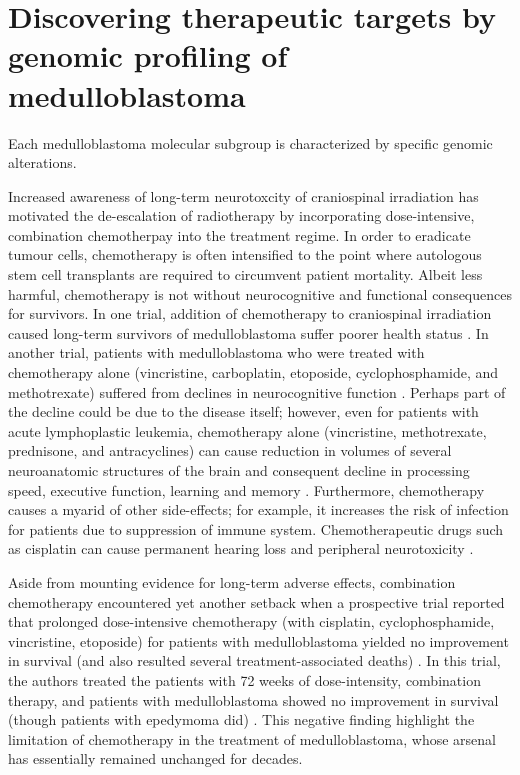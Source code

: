 \chapter{Discovering therapeutic targets by genomic profiling of medulloblastoma}
\label{ch:target-id}

\begin{hypothesis}
Each medulloblastoma molecular subgroup is characterized by specific genomic alterations.
\end{hypothesis}

Increased awareness of long-term neurotoxcity of craniospinal irradiation has motivated the de-escalation of radiotherapy by incorporating dose-intensive, combination chemotherpay into the treatment regime. In order to eradicate tumour cells, chemotherapy is often intensified to the point where autologous stem cell transplants are required to circumvent patient mortality. Albeit less harmful, chemotherapy is not without neurocognitive and functional consequences for survivors. In one trial, addition of chemotherapy to craniospinal irradiation caused long-term survivors of medulloblastoma suffer poorer health status . In another trial, patients with medulloblastoma who were treated with chemotherapy alone (vincristine, carboplatin, etoposide, cyclophosphamide, and methotrexate) suffered from declines in neurocognitive function . Perhaps part of the decline could be due to the disease itself; however, even for patients with acute lymphoplastic leukemia, chemotherapy alone (vincristine, methotrexate, prednisone, and antracyclines) can cause reduction in volumes of several neuroanatomic structures of the brain and consequent decline in processing speed, executive function, learning and memory . Furthermore, chemotherapy causes a myarid of other side-effects; for example, it increases the risk of infection for patients due to suppression of immune system. Chemotherapeutic drugs such as cisplatin can cause permanent hearing loss and peripheral neurotoxicity .

Aside from mounting evidence for long-term adverse effects, combination chemotherapy encountered yet another setback when a prospective trial reported that prolonged dose-intensive chemotherapy (with cisplatin, cyclophosphamide, vincristine, etoposide) for patients with medulloblastoma yielded no improvement in survival (and also resulted several treatment-associated deaths) . In this trial, the authors treated the patients with 72 weeks of dose-intensity, combination therapy, and patients with medulloblastoma showed no improvement in survival (though patients with epedymoma did) . This negative finding highlight the limitation of chemotherapy in the treatment of medulloblastoma, whose arsenal has essentially remained unchanged for decades.

